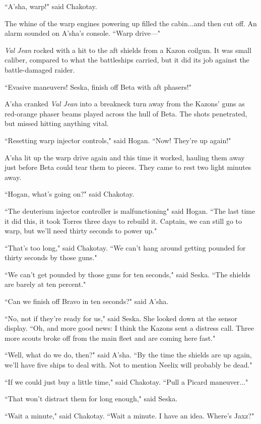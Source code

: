 \documentclass[twoside,letterpaper,12pt]{memoir}
\begin{document}
``A'sha, warp!" said Chakotay.

The whine of the warp engines powering up filled the cabin...and then cut off. An alarm sounded on A'sha's console. ``Warp drive---"

\textit{Val Jean} rocked with a hit to the aft shields from a Kazon coilgun. It was small caliber, compared to what the battleships carried, but it did its job against the battle-damaged raider.

``Evasive maneuvers! Seska, finish off Beta with aft phasers!"

A'sha cranked \textit{Val Jean} into a breakneck turn away from the Kazons' guns as red-orange phaser beams played across the hull of Beta. The shots penetrated, but missed hitting anything vital.

``Resetting warp injector controls," said Hogan. ``Now! They're up again!"

A'sha lit up the warp drive again and this time it worked, hauling them away just before Beta could tear them to pieces. They came to rest two light minutes away.

``Hogan, what's going on?" said Chakotay.

``The deuterium injector controller is malfunctioning" said Hogan. ``The last time it did this, it took Torres three days to rebuild it. Captain, we can still go to warp, but we'll need thirty seconds to power up."

``That's too long," said Chakotay. ``We can't hang around getting pounded for thirty seconds by those guns."

``We can't get pounded by those guns for ten seconds," said Seska. ``The shields are barely at ten percent."

``Can we finish off Bravo in ten seconds?" said A'sha.

``No, not if they’re ready for us," said Seska. She looked down at the sensor display. ``Oh, and more good news: I think the Kazons sent a distress call. Three more scouts broke off from the main fleet and are coming here fast."

``Well, what do we do, then?" said A'sha. ``By the time the shields are up again, we'll have five ships to deal with. Not to mention Neelix will probably be dead."

``If we could just buy a little time," said Chakotay. ``Pull a Picard maneuver..."

``That won't distract them for long enough," said Seska.

``Wait a minute," said Chakotay. ``Wait a minute. I have an idea. Where's Jaxz?"
\end{document}
